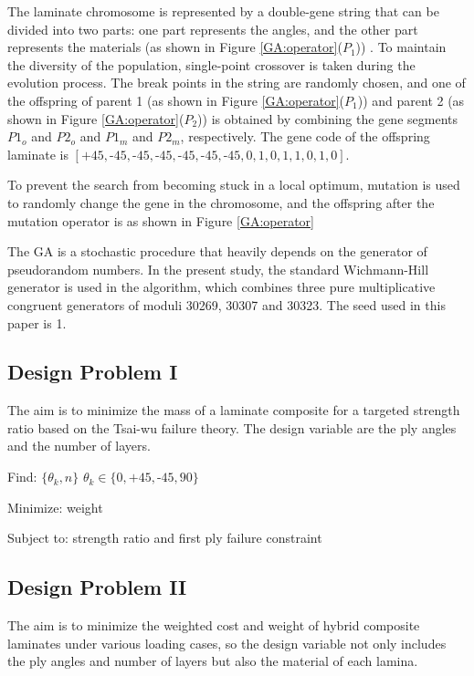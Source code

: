 \documentclass[USenglish,twocolumn]{article}
\begin{document}
The laminate chromosome is represented by a double-gene string that can be divided into two parts:
one part represents the angles, and the other part represents the materials (as shown in Figure
\ref{GA:operator}($P_1$)) . To maintain the diversity of the population, single-point crossover is
taken during the evolution process. The break points in the string are randomly chosen, and one of
the offspring of parent 1 (as shown in Figure \ref{GA:operator}($P_1$)) and parent 2 (as shown in
Figure \ref{GA:operator}($P_2$)) is obtained by combining the gene segments $P1_o$ and $P2_o$ and
$P1_m$ and $P2_m$, respectively. The gene code of the offspring laminate is
$[\text{+}45,\text{-}45,\text{-}45,\text{-}45,\text{-}45,\text{-}45,\text{-}45,0,1,0,1,1,0,1,0]$.


To prevent the search from becoming stuck in a local optimum, mutation is used to randomly change the
gene in the chromosome, and the offspring after the mutation operator is as shown in Figure
\ref{GA:operator}

The GA is a stochastic procedure that heavily depends on the generator of pseudorandom numbers. In
the present study, the standard Wichmann-Hill generator is used in the algorithm, which combines
three pure multiplicative congruent generators of moduli 30269, 30307 and 30323. The seed used
in this paper is 1.

\subsection{Design Problem I}

The aim is to minimize the mass of a laminate composite for a targeted strength
ratio based on the Tsai-wu failure theory. The design variable are the ply angles and the
number of layers.

Find: $\{\theta_k, n\}$ $\theta_k \in \{ 0,\text{+}45,\text{-}45,90\}$

Minimize: weight

Subject to: strength ratio and first ply failure constraint


\subsection{Design Problem II}
The aim is to minimize the weighted cost and weight of hybrid composite
laminates under various loading cases, so the design variable not only includes
the ply angles and number of layers but also the material of each lamina.
\end{document}
